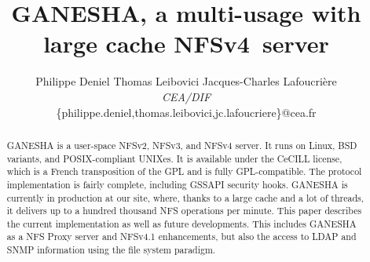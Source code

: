 \documentclass[final]{ols}
\begin{document}

\title{GANESHA, a multi-usage with large cache NFSv4~server}
\date{}             %


\author{%
Philippe Deniel \hspace{3ex} Thomas Leibovici \hspace{3ex} Jacques-Charles Lafoucri\`ere\\
{\itshape CEA/DIF}\\
{\ttfamily\normalsize \{philippe.deniel,thomas.leibovici,jc.lafoucriere\}@cea.fr}\\
} %

\maketitle

\begin{abstract}

  GANESHA is a user-space NFSv2, NFSv3, and NFSv4 server. It runs on
  Linux, BSD variants, and POSIX-compliant UNIXes. It is available
  under the CeCILL license, which is a French transposition of the GPL
  and is fully GPL-compatible. The protocol implementation is fairly
  complete, including GSSAPI security hooks.  GANESHA is currently in
  production at our site, where, thanks to a large cache and a lot of
  threads, it delivers up to a hundred thousand NFS operations per
  minute. This paper describes the current implementation as well as
  future developments. This includes GANESHA as a NFS Proxy server and
  NFSv4.1 enhancements, but also the access to LDAP and SNMP
  information using the file system paradigm.

\end{abstract}
\end{document}
